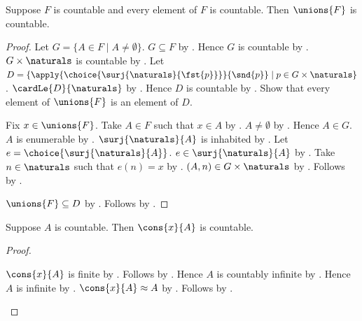 \begin{theorem}\label{countable_union_of_countable_sets}
    Suppose $F$ is countable and every element of $F$ is countable.
    Then $\unions{F}$ is countable.
\end{theorem}
\begin{proof}
    Let $G=\{A\in F\mid A\neq\emptyset\}$.
    $G\subseteq F$ by .
    Hence $G$ is countable by .
    $G\times\naturals$ is countable by
        .
    Let $D=\{\apply{\choice{\surj{\naturals}{\fst{p}}}}{\snd{p}}
        \mid p\in G\times\naturals\}$.
    $\cardLe{D}{\naturals}$ by .
    Hence $D$ is countable by .
    Show that every element of $\unions{F}$ is an element of $D$.
    \begin{subproof}
        Fix $x\in\unions{F}$.
        Take $A\in F$ such that $x\in A$ by .
        $A\neq\emptyset$ by .
        Hence $A\in G$.
        $A$ is enumerable by .
        $\surj{\naturals}{A}$ is inhabited by .
        Let $e=\choice{\surj{\naturals}{A}}$.
        $e\in\surj{\naturals}{A}$ by .
        Take $n\in\naturals$ such that $e(n)=x$ by .
        $(A,n)\in G\times\naturals$ by .
        Follows by .
    \end{subproof}
    $\unions{F}\subseteq D$ by .
    Follows by .
\end{proof}

\begin{proposition}\label{countable_cons}
    Suppose $A$ is countable.
    Then $\cons{x}{A}$ is countable.
\end{proposition}
\begin{proof}
    \begin{byCase}
            $\cons{x}{A}$ is finite by .
            Follows by .
            Hence $A$ is countably infinite
                by .
            Hence $A$ is infinite by .
            $\cons{x}{A}\approx A$ by .
            Follows by .
    \end{byCase}
\end{proof}

